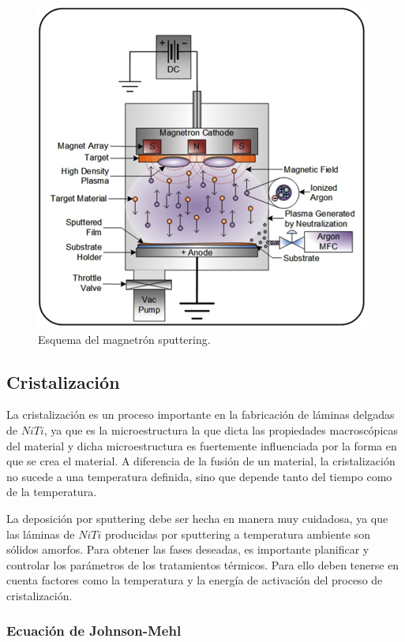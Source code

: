 \documentclass[12pt]{article}
\theoremstyle{definition}
\theoremstyle{remark}
\begin{document}
\begin{figure}[H]
	\centering
	\includegraphics[scale=1]{img/diagram-dc-magnatron.png}
	\caption{Esquema del magnetrón sputtering.}
	\label{sputter}
\end{figure}

\subsection{Cristalización}

La cristalización es un proceso importante en la fabricación de láminas delgadas de $NiTi$, ya que es la microestructura la que dicta las propiedades macroscópicas del material y dicha microestructura es fuertemente influenciada por la forma en que se crea el material. A diferencia de la fusión de un material, la cristalización no sucede a una temperatura definida, sino que depende tanto del tiempo como de la temperatura.

La deposición por sputtering debe ser hecha en manera muy cuidadosa, ya que las láminas de $NiTi$ producidas por sputtering a temperatura ambiente son sólidos amorfos. Para obtener las fases deseadas, es importante planificar y controlar los parámetros de los tratamientos térmicos. Para ello deben tenerse en cuenta factores como la temperatura y la energía de activación del proceso de cristalización.

\subsubsection{Ecuación de Johnson-Mehl}
\end{document}
